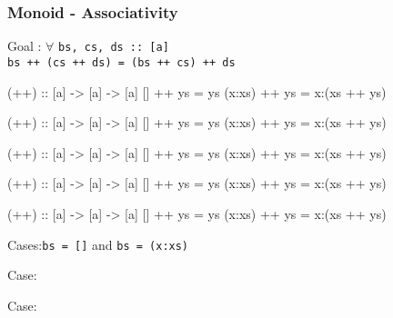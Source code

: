 \documentclass{beamer}
\newcommand{\ca}[1]{{\color{blue}#1}}
\newcommand{\cb}[1]{{\color{violet}#1}}
\newcommand{\cc}[1]{{\color{red}#1}}
\newcommand{\ce}[1]{{\color{green!50!black}#1}}
\begin{document}
\begin{frame}[t,fragile]
    \frametitle {Monoid - Associativity}

\begingroup
\color{gray}\fontsize{10}{9.8}\selectfont

Goal : $\forall$ \verb?bs, cs, ds :: [a]? \\
    \quad \alert<3,17>{\Verb?bs ++ (cs ++ ds) = (bs ++ cs) ++ ds?}

\vspace{10pt}

\begin{overprint}

\begin{semiverbatim}
(++) :: [a] -> [a] -> [a]
[]     ++ ys = ys
(x:xs) ++ ys = x:(xs ++ ys)
\end{semiverbatim}

\begin{semiverbatim}
(++) :: [a] -> [a] -> [a]
\ca{[]}     ++ \cb{ys} = ys
(x:xs) ++ ys = x:(xs ++ ys)
\end{semiverbatim}

\begin{semiverbatim}
(++) :: [a] -> [a] -> [a]
\ca{[]}     ++ \cb{ys} = \cb{ys}
(x:xs) ++ ys = x:(xs ++ ys)
\end{semiverbatim}

\begin{semiverbatim}
(++) :: [a] -> [a] -> [a]
[]     ++ ys = ys
(\ca{x}:\cb{xs}) ++ \cc{ys} = x:(xs ++ ys)
\end{semiverbatim}

\begin{semiverbatim}
(++) :: [a] -> [a] -> [a]
[]     ++ ys = ys
(\ca{x}:\cb{xs}) ++ \cc{ys} = \ca{x}:(\cb{xs} ++ \cc{ys})
\end{semiverbatim}

\end{overprint}

\endgroup

\vspace{10pt}

\begin{overprint}

Cases:\quad\Verb?bs = []? \quad and \Verb?bs = (x:xs)?

Case:\quad{\ce{\Verb?bs = ?\alert<4>{\Verb?[]?}}} 

Case:\quad{\ce{\Verb?bs = []?}} \checkmark 


\end{overprint}
\end{frame}
\end{document}
